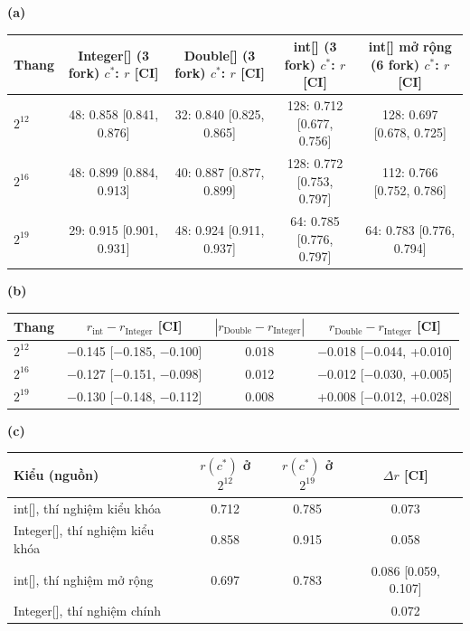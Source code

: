 \setlength{\tabcolsep}{3pt}
\textbf{(a)}\par\smallskip
\begin{tabular}{lcccc}
\toprule
Thang & \makecell{{Integer[] (3 fork)} \\ {$c^*$: $r$ [CI]}} & \makecell{{Double[] (3 fork)} \\ {$c^*$: $r$ [CI]}} & \makecell{{int[] (3 fork)} \\ {$c^*$: $r$ [CI]}} & \makecell{{int[] mở rộng (6 fork)} \\ {$c^*$: $r$ [CI]}} \\
\midrule
$2^{12}$ & 48: 0.858 [0.841, 0.876] & 32: 0.840 [0.825, 0.865] & 128: 0.712 [0.677, 0.756] & 128: 0.697 [0.678, 0.725] \\
$2^{16}$ & 48: 0.899 [0.884, 0.913] & 40: 0.887 [0.877, 0.899] & 128: 0.772 [0.753, 0.797] & 112: 0.766 [0.752, 0.786] \\
$2^{19}$ & 29: 0.915 [0.901, 0.931] & 48: 0.924 [0.911, 0.937] & 64: 0.785 [0.776, 0.797] & 64: 0.783 [0.776, 0.794] \\
\bottomrule
\end{tabular}
\bigskip

\textbf{(b)}\par\smallskip
\begin{tabular}{lccc}
\toprule
Thang & \makecell{{$r_{\mathrm{int}}-r_{\mathrm{Integer}}$} \\ {[CI]}} & $|r_{\mathrm{Double}}-r_{\mathrm{Integer}}|$ & \makecell{{$r_{\mathrm{Double}}-r_{\mathrm{Integer}}$} \\ {[CI]}} \\
\midrule
$2^{12}$ & $-$0.145 [$-$0.185, $-$0.100] & 0.018 & $-$0.018 [$-$0.044, +0.010] \\
$2^{16}$ & $-$0.127 [$-$0.151, $-$0.098] & 0.012 & $-$0.012 [$-$0.030, +0.005] \\
$2^{19}$ & $-$0.130 [$-$0.148, $-$0.112] & 0.008 & +0.008 [$-$0.012, +0.028] \\
\bottomrule
\end{tabular}
\bigskip

\textbf{(c)}\par\smallskip
\begin{tabular}{lccc}
\toprule
Kiểu (nguồn) & $r(c^*)$ ở $2^{12}$ & $r(c^*)$ ở $2^{19}$ & $\Delta r$ [CI] \\
\midrule
int[], thí nghiệm kiểu khóa & 0.712 & 0.785 & 0.073 \\
Integer[], thí nghiệm kiểu khóa & 0.858 & 0.915 & 0.058 \\
int[], thí nghiệm mở rộng & 0.697 & 0.783 & 0.086 [0.059, 0.107] \\
Integer[], thí nghiệm chính &  &  & 0.072 \\
\bottomrule
\end{tabular}
